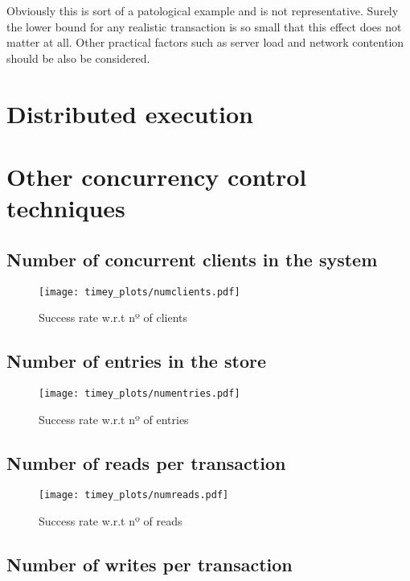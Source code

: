 \documentclass[a4paper, 10pt]{article}
\begin{document}
Obviously this is sort of a patological example and is not representative. Surely the lower bound for any realistic transaction is so small that this effect does not matter at all. Other practical factors such as server load and network contention should be also be considered.
\clearpage
\section{Distributed execution}

\clearpage
\section{Other concurrency control techniques}


\subsection{Number of concurrent clients in the system}

\begin{figure}[H]
  \centering
  \texttt{[image: timey\_plots/numclients.pdf]}
    \caption{Success rate w.r.t nº of clients}
    \label{timey:numclients}
\end{figure} 


\subsection{Number of entries in the store}

\begin{figure}[H]
  \centering
  \texttt{[image: timey\_plots/numentries.pdf]}
    \caption{Success rate w.r.t nº of entries}
    \label{timey:numentries}
\end{figure} 

\subsection{Number of reads per transaction}

\begin{figure}[H]
  \centering
  \texttt{[image: timey\_plots/numreads.pdf]}
    \caption{Success rate w.r.t nº of reads}
    \label{timey:numreads}
\end{figure} 

\subsection{Number of writes per transaction}
\end{document}

